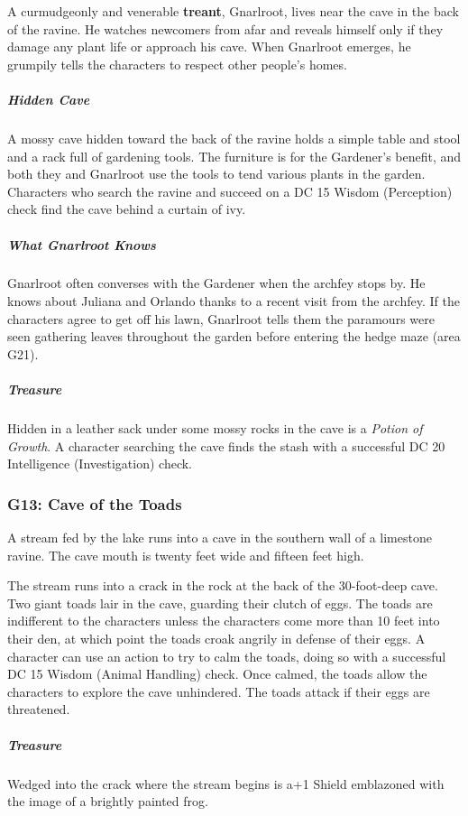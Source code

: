 \documentclass[10pt,a4paper,twoside,bg=print,twocolumn,openany,nodeprecatedcode]{dndbook}
\begin{document}
A curmudgeonly and venerable \textbf{treant}, Gnarlroot, lives near the cave in the back of the ravine. He watches newcomers from afar and reveals himself only if they damage any plant life or approach his cave. When Gnarlroot emerges, he grumpily tells the characters to respect other people's homes.

\subparagraph{Hidden Cave}
A mossy cave hidden toward the back of the ravine holds a simple table and stool and a rack full of gardening tools. The furniture is for the Gardener's benefit, and both they and Gnarlroot use the tools to tend various plants in the garden. Characters who search the ravine and succeed on a DC 15 Wisdom (Perception) check find the cave behind a curtain of ivy.

\subparagraph{What Gnarlroot Knows}
Gnarlroot often converses with the Gardener when the archfey stops by. He knows about Juliana and Orlando thanks to a recent visit from the archfey. If the characters agree to get off his lawn, Gnarlroot tells them the paramours were seen gathering leaves throughout the garden before entering the hedge maze (area G21).

\subparagraph{Treasure}
Hidden in a leather sack under some mossy rocks in the cave is a \textit{Potion of Growth}. A character searching the cave finds the stash with a successful DC 20 Intelligence (Investigation) check.

\subsubsection{G13: Cave of the Toads}
\begin{DndReadAloud}{}
A stream fed by the lake runs into a cave in the southern wall of a limestone ravine. The cave mouth is twenty feet wide and fifteen feet high.

\end{DndReadAloud}

The stream runs into a crack in the rock at the back of the 30-foot-deep cave. Two giant toads lair in the cave, guarding their clutch of eggs. The toads are indifferent to the characters unless the characters come more than 10 feet into their den, at which point the toads croak angrily in defense of their eggs. A character can use an action to try to calm the toads, doing so with a successful DC 15 Wisdom (Animal Handling) check. Once calmed, the toads allow the characters to explore the cave unhindered. The toads attack if their eggs are threatened.

\subparagraph{Treasure}
Wedged into the crack where the stream begins is a+1 Shield emblazoned with the image of a brightly painted frog.
\end{document}

